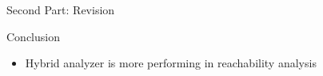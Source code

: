 \documentclass[8pt]{beamer}
\begin{document}
%
%
%

\begin{frame}{Second Part: Revision}
    
\end{frame}

\begin{frame}{Conclusion}
\begin{itemize}
    \item Hybrid analyzer is more performing in reachability analysis
\end{itemize}

\end{frame}

%    
%    
\end{document}
